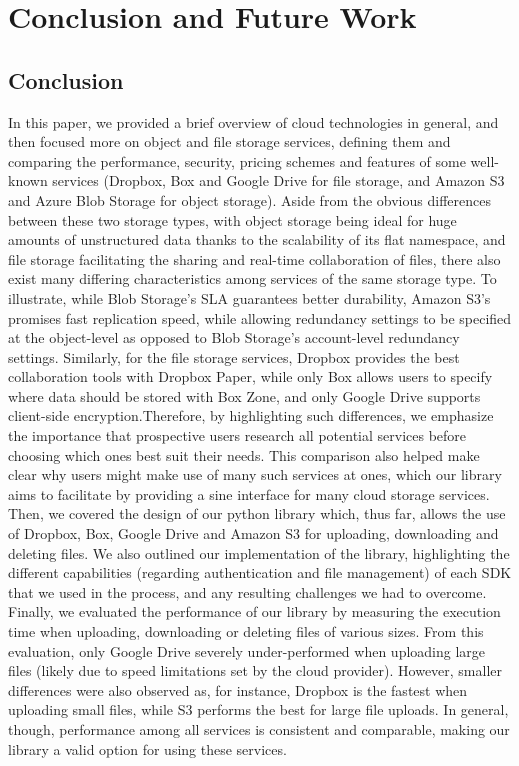 \chapter{Conclusion and Future Work}\label{ch:conclusion}

\section{Conclusion}
In this paper, we provided a brief overview of cloud technologies in general, and then focused more on object and file storage services, defining them and comparing the performance, security, pricing schemes and features of some well-known services (Dropbox, Box and Google Drive for file storage, and Amazon S3 and Azure Blob Storage for object storage). Aside from the obvious differences between these two storage types, with object storage being ideal for huge amounts of unstructured data thanks to the scalability of its flat namespace, and file storage facilitating the sharing and real-time collaboration of files, there also exist many differing characteristics among services of the same storage type. To illustrate, while Blob Storage's SLA guarantees better durability, Amazon S3's promises fast replication speed, while allowing redundancy settings to be specified at the object-level as opposed to  Blob Storage's account-level redundancy settings. Similarly, for the file storage services, Dropbox provides the best collaboration tools with Dropbox Paper, while only Box allows users to specify where data should be stored with Box Zone, and only Google Drive supports client-side encryption.Therefore, by highlighting such differences, we emphasize the importance that prospective users research all potential services before choosing which ones best suit their needs. This comparison also helped make clear why users might make use of many such services at ones, which our library aims to facilitate by providing a sine interface for  many cloud storage services. Then, we covered the design of our python library which, thus far, allows the use of Dropbox, Box, Google Drive and Amazon S3 for uploading, downloading and deleting files. We also outlined our implementation of the library, highlighting the different capabilities (regarding authentication and file management) of each SDK that we used in the process, and any resulting challenges we had to overcome. Finally, we evaluated the performance of our library by measuring the execution time when uploading, downloading or deleting files of various sizes. From this evaluation, only Google Drive severely under-performed when uploading large files (likely due to speed limitations set by the cloud provider). However, smaller differences were also observed as, for instance, Dropbox is the fastest when uploading small files, while S3 performs the best for large file uploads. In general, though, performance among all services is consistent and comparable, making our library a valid option for using these services. 

